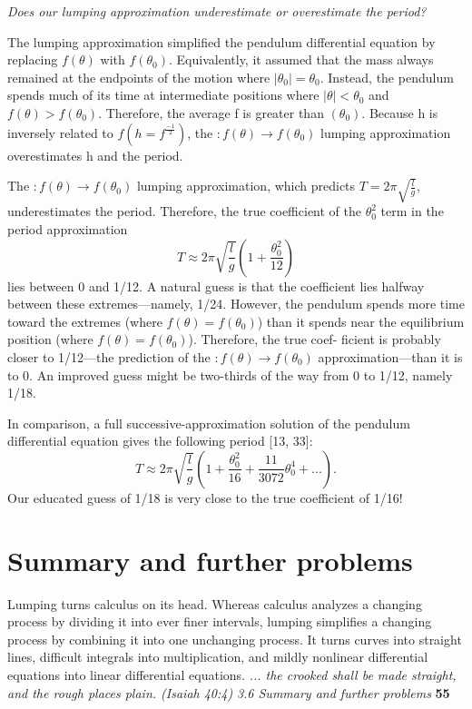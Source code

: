\documentclass[a4paper, 11pt]{book}
\begin{document}
\textit{Does our lumping approximation underestimate or overestimate the period?}

The lumping approximation simplified the pendulum differential equation
by replacing $f(\theta)$ with $f(\theta_{0})$. Equivalently, it assumed that the mass
always remained at the endpoints of the motion where $|\theta_{0}| = \theta_{0}$. Instead,
the pendulum spends much of its time at intermediate positions where
$|\theta| < \theta_{0}$ and $f(\theta) > f(\theta_{0})$. Therefore, the average f is greater than $(\theta_{0})$.
Because h is inversely related to $f (h = f^\frac{-1}{2})$, the $\colon f(\theta) \to f(\theta_{0})$ lumping
approximation overestimates h and the period.

The $\colon f(\theta) \to f(\theta_{0})$ lumping approximation, which predicts $T= 2\pi\sqrt{\frac{l}{g}}$,
underestimates the period. Therefore, the true coefficient of the $\theta_{0}^2$
term
in the period approximation
\begin{equation}T\approx 2\pi\sqrt{\frac{l}{g}}\left(1+\frac{\theta_{0}^2}{12}\right)\end{equation}
lies between 0 and 1/12. A natural guess is that the coefficient lies halfway
between these extremes—namely, 1/24. However, the pendulum spends
more time toward the extremes (where $f(\theta) = f(\theta_{0})$) than it spends near
the equilibrium position (where $f(\theta)=f(\theta_{0})$). Therefore, the true coef-
ficient is probably closer to 1/12—the prediction of the $\colon f(\theta) \to f(\theta_{0})$
approximation—than it is to 0. An improved guess might be two-thirds
of the way from 0 to 1/12, namely 1/18.

In comparison, a full successive-approximation solution of the pendulum
differential equation gives the following period [13, 33]:
\begin{equation}T\approx 2\pi\sqrt{\frac{l}{g}}\left(1+\frac{\theta_{0}^2}{16}+\frac{11}{3072}\theta_{0}^4+...\right).\end{equation}
Our educated guess of 1/18 is very close to the true coefficient of 1/16!

\noindent
\section[toc]{Summary and further problems}
Lumping turns calculus on its head. Whereas calculus analyzes a changing
process by dividing it into ever finer intervals, lumping simplifies a
changing process by combining it into one unchanging process. It turns
curves into straight lines, difficult integrals into multiplication, and mildly
nonlinear differential equations into linear differential equations.
\normalsize \textit{... the crooked shall be made straight, and the rough places plain. (Isaiah 40:4)}
\newpage
\noindent
\large\textit{3.6 Summary and further problems} \hfill \textbf{55} \\
\end{document}
